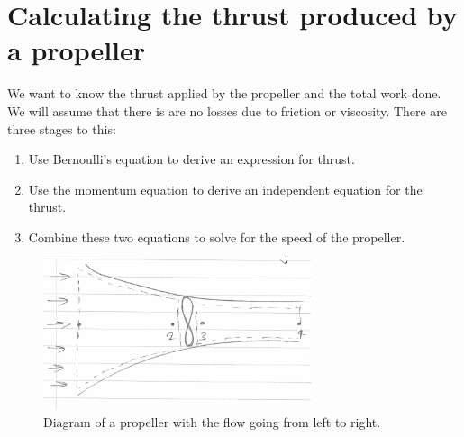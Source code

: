\documentclass[class=report, crop=false, 12pt,a4paper]{standalone}
\begin{document}
\section{Calculating the thrust produced by a propeller}
We want to know the thrust applied by the propeller and the total work done. We will assume that there is are no losses due to friction or viscosity. There are three stages to this: 
\begin{enumerate}[noitemsep]
  \item Use Bernoulli's equation to derive an expression for thrust.
  \item Use the momentum equation to derive an independent equation for the thrust.
  \item Combine these two equations to solve for the speed of the propeller.
\end{enumerate}
\begin{figure}
  \centering
  \includegraphics[width = 0.7\textwidth]{../img/PropDiagram}
  \caption{Diagram of a propeller with the flow going from left to right.}
\end{figure}
\end{document}

